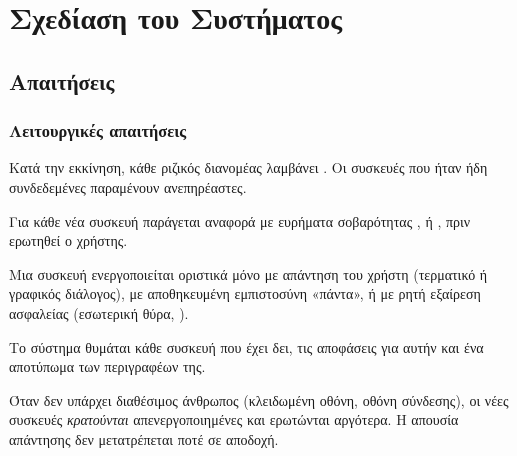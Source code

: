 \chapter{Σχεδίαση του Συστήματος}
\label{ch:design}

\section{Απαιτήσεις}
\label{sec:requirements}

\subsection{Λειτουργικές απαιτήσεις}

\begin{requirement}\label{req:closed}
Κατά την εκκίνηση, κάθε ριζικός διανομέας λαμβάνει .
Οι συσκευές που ήταν ήδη συνδεδεμένες παραμένουν ανεπηρέαστες.
\end{requirement}

\begin{requirement}\label{req:analysis}
Για κάθε νέα συσκευή παράγεται αναφορά με ευρήματα σοβαρότητας
\sevC, \sevW{} ή \sevN, πριν ερωτηθεί ο χρήστης.
\end{requirement}

\begin{requirement}\label{req:human}
Μια συσκευή ενεργοποιείται οριστικά μόνο με απάντηση του χρήστη (τερματικό ή
γραφικός διάλογος), με αποθηκευμένη εμπιστοσύνη «πάντα», ή με ρητή εξαίρεση
ασφαλείας (εσωτερική θύρα, ).
\end{requirement}

\begin{requirement}[Μνήμη]\label{req:memory}
Το σύστημα θυμάται κάθε συσκευή που έχει δει, τις αποφάσεις για αυτήν και ένα
αποτύπωμα των περιγραφέων της.
\end{requirement}

\begin{requirement}\label{req:no-answer}
Όταν δεν υπάρχει διαθέσιμος άνθρωπος (κλειδωμένη οθόνη, οθόνη σύνδεσης), οι νέες
συσκευές \emph{κρατούνται} απενεργοποιημένες και ερωτώνται αργότερα. Η απουσία
απάντησης δεν μετατρέπεται ποτέ σε αποδοχή.
\end{requirement}

